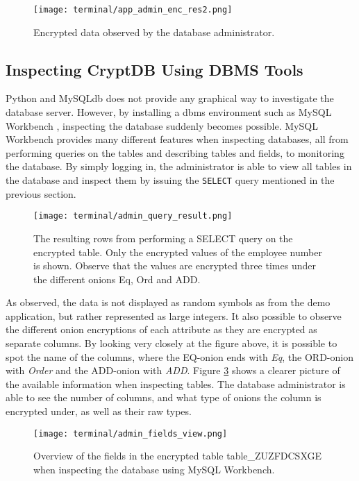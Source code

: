 \begin{figure}[h]
	\centering
	\texttt{[image: terminal/app\_admin\_enc\_res2.png]}
	\caption{Encrypted data observed by the database administrator.}
	\label{fig:admin_enc_res2}
\end{figure}



\newpage
\subsection{Inspecting CryptDB Using DBMS Tools}

Python and MySQLdb does not provide any graphical way to investigate the database server. However, by installing a \gls{dbms} environment such as MySQL Workbench \cite{mysql_workbench}, inspecting the database suddenly becomes possible. MySQL Workbench provides many different features when inspecting databases, all from performing queries on the tables and describing tables and fields, to 
monitoring the database. By simply logging in, the administrator is able to view all tables in the database and inspect them by issuing the \verb!SELECT! query mentioned in the previous section.

\begin{figure}[h]
	\centering
	\texttt{[image: terminal/admin\_query\_result.png]}
	\caption{The resulting rows from performing a SELECT query on the encrypted table. Only the encrypted values of the employee number is shown. Observe that the values are encrypted three times under the different onions Eq, Ord and ADD.}
	\label{fig:admin_query_result}
\end{figure}

As observed, the data is not displayed as random symbols as from the demo application, but rather represented as large integers. It also possible to observe the different onion encryptions of each attribute as they are encrypted as separate columns. By looking very closely at the figure above, it is possible to spot the name of the columns, where the EQ-onion ends with \emph{Eq}, the ORD-onion with \emph{Order} and the ADD-onion with \emph{ADD}. Figure \ref{fig:admin_fields_view} shows a clearer picture of the available information when inspecting tables. The database administrator is able to see the number of columns, and what type of onions the column is encrypted under, as well as their raw types.

\begin{figure}[h]
	\centering
	\texttt{[image: terminal/admin\_fields\_view.png]}
	\caption{Overview of the fields in the encrypted table table\_ZUZFDCSXGE when inspecting the database using MySQL Workbench.}
	\label{fig:admin_fields_view}
\end{figure}

